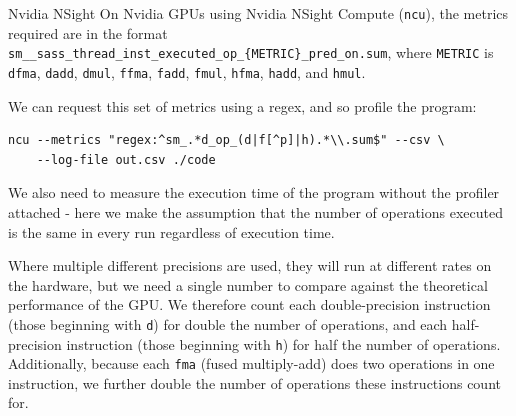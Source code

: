 


%     

\begin{instructions}{Nvidia NSight}
On Nvidia GPUs using Nvidia NSight Compute (\verb|ncu|), the metrics required are in the format
\verb|sm__sass_thread_inst_executed_op_{METRIC}_pred_on.sum|,
where \verb|METRIC| is \verb|dfma|, \verb|dadd|, \verb|dmul|, \verb|ffma|, \verb|fadd|, \verb|fmul|, \verb|hfma|, \verb|hadd|, and \verb|hmul|.

We can request this set of metrics using a regex, and so profile the program:
\begin{verbatim}
ncu --metrics "regex:^sm_.*d_op_(d|f[^p]|h).*\\.sum$" --csv \
    --log-file out.csv ./code
\end{verbatim}

 
\end{instructions}

We also need to measure the execution time of the program without the profiler attached - here we make the assumption that the number of operations executed is the same in every run regardless of execution time.

Where multiple different precisions are used, they will run at different rates on the hardware, but we need a single number to compare against the theoretical performance of the GPU. We therefore count each double-precision instruction (those beginning with \verb|d|) for double the number of operations, and each half-precision instruction (those beginning with \verb|h|) for half the number of operations. Additionally, because each \verb|fma| (fused multiply-add) does two operations in one instruction, we further double the number of operations these instructions count for.

